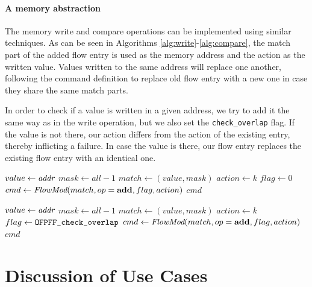 \documentclass[conference]{sigcomm-alternate}
\newcommand{\concat}[0]{\oplus}
\newcommand{\compare}{compare\xspace}
\newcommand{\memwrite}{write\xspace}
\newcommand{\addr}{\emph{addr}\xspace}
\newcommand{\add}{\textbf{add}\xspace}
\newcommand{\checko}{\texttt{check\_overlap}\xspace}
\begin{document}
\paragraph{A memory abstraction}
The memory \memwrite and \compare
 operations can be implemented using similar techniques.
 As can be seen in Algorithms \ref{alg:write}-\ref{alg:compare},
  the match part of the added flow entry is used as the memory address and the action as
  the written value. Values written to the same address will replace one another,
following the command definition to replace old flow entry with a new one in case they
share the same match parts.

In order to check if a value is written in a given address,
we try to add it the same way as in the \memwrite operation,
but we also set the \texttt{\checko} flag. If the value is not there,
our action differs from the action of the existing entry,
thereby inflicting a failure.
In case the value is there, our flow entry replaces the existing flow entry
with an identical one.

\begin{algorithm}[h]
    \caption{$\textit{write}(\addr,k)$}
    \label{alg:write}
    \begin{algorithmic}[1]
    		\State $value \gets \addr$
    		\State $mask \gets  all-1$
    		\State $match \gets (value,mask)$
    		\State $action \gets k$
    		\State $flag \gets 0$
    		\State $cmd\gets \emph{FlowMod}(match, op = \add, flag, action) $
			\Return $cmd$
    \end{algorithmic}
\end{algorithm}

\begin{algorithm}[h]
    \caption{$\textit{\compare}(\addr,k)$}
    \label{alg:compare}
    \begin{algorithmic}[1]
    		\State $value \gets \addr$
    		\State $mask \gets  all-1$
    		\State $match \gets (value,mask)$
    		\State $action \gets k$
    		\State $flag \gets \texttt{OFPFF\_\checko}$
    		\State $cmd\gets \emph{FlowMod}(match, op = \add, flag, action) $
			\Return $cmd$
    \end{algorithmic}
\end{algorithm}




\section{Discussion of Use Cases}\label{sec:apps}
\end{document}
